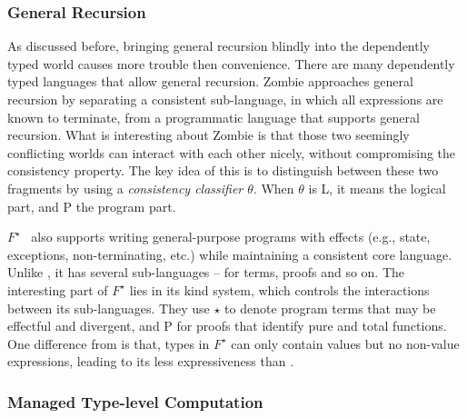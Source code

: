 \subsubsection{General Recursion}

As discussed before, bringing general recursion blindly into the dependently typed world causes more trouble then convenience. There are many dependently typed languages that allow general recursion. Zombie approaches general recursion by separating a consistent sub-language, in which all expressions are known to terminate, from a programmatic language that supports general recursion. What is interesting about Zombie is that those two seemingly conflicting worlds can interact with each other nicely, without compromising the consistency property. The key idea of this is to distinguish between these two fragments by using a \emph{consistency classifier $\theta$}. When $\theta$ is \textsf{L}, it means the logical part, and \textsf{P} the program part.

$F^{\star}$~\cite{Swamy2011} also supports writing general-purpose programs with effects (e.g., state, exceptions, non-terminating, etc.) while maintaining a consistent core language. Unlike \name, it has several sub-languages -- for terms, proofs and so on. The interesting part of $F^{\star}$ lies in its kind system, which controls the interactions between its sub-languages. They use $\star$ to denote program terms that may be effectful and divergent, and \textsf{P} for proofs that identify pure and total functions. One difference from \name is that, types in $F^{\star}$ can only contain values but no non-value expressions, leading to its less expressiveness than \name.

\subsubsection{Managed Type-level Computation}


